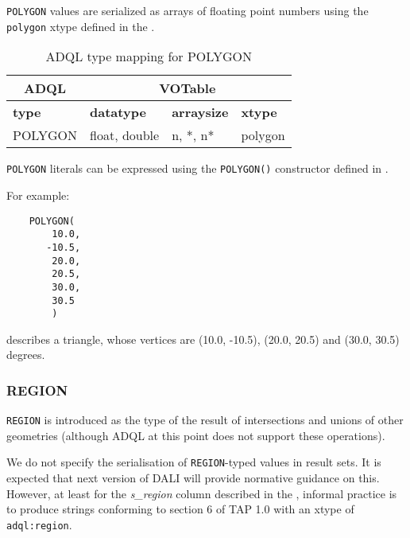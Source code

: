 \documentclass[11pt,a4paper]{ivoa}
\begin{document}
\verb:POLYGON: values are serialized as arrays of floating point numbers
using the \verb:polygon: xtype defined in the \DALISpec{}.

\begin{table}[th]\footnotesize
    \begin{tabular}
        {|p{}|p{}|p{}|p{}|}

        \hline
        \multicolumn{1}{|c|}{\textbf{ADQL}} &
        \multicolumn{3}{|c|}{\textbf{VOTable}}
        \tabularnewline

        \hline
        \textbf{type} &
        \textbf{datatype} &
        \textbf{arraysize} &
        \textbf{xtype}
        \tabularnewline

        \hline
        POLYGON &
        float, double &
        n, *, n* &
        polygon
        \tabularnewline
        \hline
    \end{tabular}
    \caption{ADQL type mapping for POLYGON}
    \label{table:types.geom.polygon}
\end{table}

\verb:POLYGON: literals can be expressed using the \verb:POLYGON():
constructor defined in .

For example:
\begin{verbatim}
    POLYGON(
        10.0,
       -10.5,
        20.0,
        20.5,
        30.0,
        30.5
        )
\end{verbatim}
\noindent
describes a triangle, whose vertices are (10.0, -10.5), (20.0, 20.5)
and (30.0, 30.5) degrees.

\subsubsection{REGION}
\label{sec:types.geom.region}

\verb:REGION: is introduced as the type of the result of intersections and
unions of other geometries (although ADQL at this point does not support
these operations).

We do not specify the serialisation of \verb:REGION:-typed values in result
sets.  It is expected that next version of DALI will provide normative
guidance on this. However, at least for the \textit{s\_region}
column described in the \ObsCoreSpec{},
informal practice is to produce strings conforming to section 6
of TAP 1.0 \citep{2010ivoa.spec.0327D} with an xtype of
\texttt{adql:region}.
\end{document}
